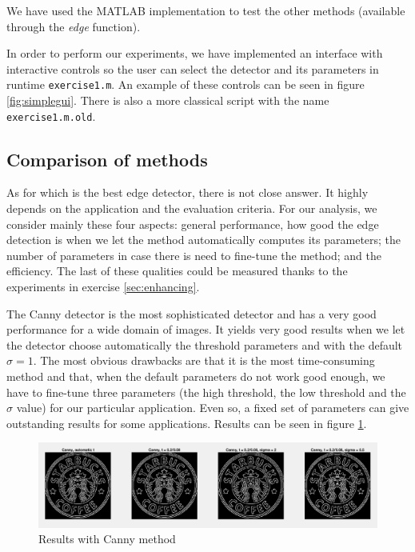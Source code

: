 We have used the MATLAB implementation to test the other methods
(available through the \emph{edge} function).

In order to perform our experiments, we have implemented an interface with interactive controls so
the user can select the detector and its parameters in runtime \texttt{exercise1.m}. An example
of these controls can be seen in figure \ref{fig:simplegui}.
There is also a more classical script with the name \texttt{exercise1.m.old}.

\subsection{Comparison of methods}

As for which is the best edge detector, there is not close answer. It highly depends on the application and the evaluation criteria. For our analysis, we consider mainly these four aspects: general
performance, how good
the edge detection is when we let the method automatically computes its parameters; the number of
parameters in case there is need to fine-tune the method; and the efficiency. The last of these
qualities could be measured thanks to the experiments in exercise \ref{sec:enhancing}.

The Canny detector is the most sophisticated detector and has a very
good performance for a wide domain of images. It yields very good results when we let the detector
choose automatically the threshold parameters and with the default $\sigma = 1$. The most obvious
drawbacks are that it is the most time-consuming method and that, when the default parameters do not
work good enough, we have to fine-tune three parameters (the high threshold, the low threshold and the
$\sigma$ value) for our particular application. Even so, a fixed set of parameters can give
outstanding results for some applications. Results can be seen in figure \ref{fig:im6}. 

\begin{figure}[!hbt]
  \includegraphics[width=\textwidth]{./img/ex1/im6.png}
  \caption{Results with Canny method}
  \label{fig:im6}
\end{figure}

